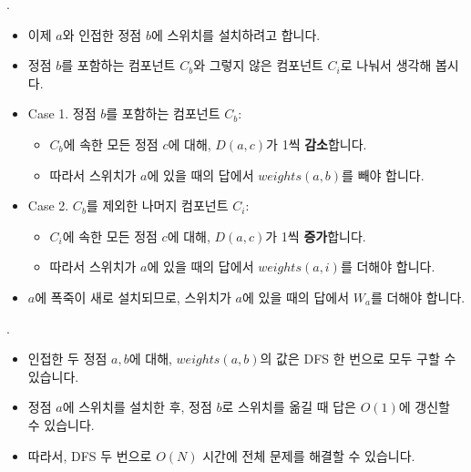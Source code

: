 \begin{frame}{\probno{}. \probtitle{}}
    \begin{itemize}
        \item 이제 $a$와 인접한 정점 $b$에 스위치를 설치하려고 합니다.
        \item 정점 $b$를 포함하는 컴포넌트 $C_b$와 그렇지 않은 컴포넌트 $C_i$로 나눠서 생각해 봅시다.
        \item Case 1. 정점 $b$를 포함하는 컴포넌트 $C_b$:
        \begin{itemize}
            \item $C_b$에 속한 모든 정점 $c$에 대해, $D(a, c)$가 1씩 \textbf{감소}합니다.
            \item 따라서 스위치가 $a$에 있을 때의 답에서 $weights(a, b)$를 빼야 합니다.
        \end{itemize}
        \item Case 2. $C_b$를 제외한 나머지 컴포넌트 $C_i$:
        \begin{itemize}
            \item $C_i$에 속한 모든 정점 $c$에 대해, $D(a, c)$가 1씩 \textbf{증가}합니다.
            \item 따라서 스위치가 $a$에 있을 때의 답에서 $weights(a, i)$를 더해야 합니다.
        \end{itemize}
        \item $a$에 폭죽이 새로 설치되므로, 스위치가 $a$에 있을 때의 답에서 $W_a$를 더해야 합니다.
    \end{itemize}
\end{frame}

\begin{frame}{\probno{}. \probtitle{}}
    \begin{itemize}
        \item 인접한 두 정점 $a, b$에 대해, $weights(a, b)$의 값은 DFS 한 번으로 모두 구할 수 있습니다.
        \item 정점 $a$에 스위치를 설치한 후, 정점 $b$로 스위치를 옮길 때 답은 $O(1)$에 갱신할 수 있습니다.
        \item 따라서, DFS 두 번으로 $O(N)$ 시간에 전체 문제를 해결할 수 있습니다.
    \end{itemize}
\end{frame}

